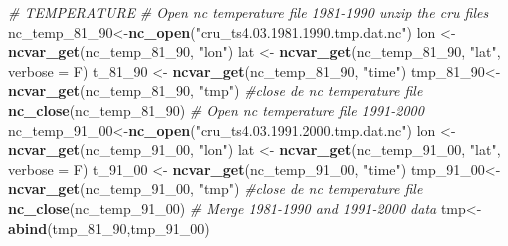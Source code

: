 \documentclass[
  10pt,
  b5paper,
]{book}
\newenvironment{Shaded}{\begin{snugshade}}{\end{snugshade}}
\newcommand{\CommentTok}[1]{\textcolor[rgb]{0.56,0.35,0.01}{\textit{#1}}}
\newcommand{\DataTypeTok}[1]{\textcolor[rgb]{0.13,0.29,0.53}{#1}}
\newcommand{\DecValTok}[1]{\textcolor[rgb]{0.00,0.00,0.81}{#1}}
\newcommand{\KeywordTok}[1]{\textcolor[rgb]{0.13,0.29,0.53}{\textbf{#1}}}
\newcommand{\NormalTok}[1]{#1}
\newcommand{\StringTok}[1]{\textcolor[rgb]{0.31,0.60,0.02}{#1}}
\begin{document}
\begin{Shaded}
\begin{Highlighting}[]
\CommentTok{# TEMPERATURE}
\CommentTok{# Open nc temperature file 1981-1990 unzip the cru files}
\NormalTok{nc_temp_}\DecValTok{81}\NormalTok{_}\DecValTok{90}\NormalTok{<-}\KeywordTok{nc_open}\NormalTok{(}\StringTok{"cru_ts4.03.1981.1990.tmp.dat.nc"}\NormalTok{)}
\NormalTok{lon <-}\StringTok{ }\KeywordTok{ncvar_get}\NormalTok{(nc_temp_}\DecValTok{81}\NormalTok{_}\DecValTok{90}\NormalTok{, }\StringTok{"lon"}\NormalTok{)}
\NormalTok{lat <-}\StringTok{ }\KeywordTok{ncvar_get}\NormalTok{(nc_temp_}\DecValTok{81}\NormalTok{_}\DecValTok{90}\NormalTok{, }\StringTok{"lat"}\NormalTok{, }\DataTypeTok{verbose =}\NormalTok{ F)}
\NormalTok{t_}\DecValTok{81}\NormalTok{_}\DecValTok{90}\NormalTok{ <-}\StringTok{ }\KeywordTok{ncvar_get}\NormalTok{(nc_temp_}\DecValTok{81}\NormalTok{_}\DecValTok{90}\NormalTok{, }\StringTok{"time"}\NormalTok{)}
\NormalTok{tmp_}\DecValTok{81}\NormalTok{_}\DecValTok{90}\NormalTok{<-}\KeywordTok{ncvar_get}\NormalTok{(nc_temp_}\DecValTok{81}\NormalTok{_}\DecValTok{90}\NormalTok{, }\StringTok{"tmp"}\NormalTok{)}
\CommentTok{#close de nc temperature file}
\KeywordTok{nc_close}\NormalTok{(nc_temp_}\DecValTok{81}\NormalTok{_}\DecValTok{90}\NormalTok{) }
\CommentTok{# Open nc temperature file 1991-2000}
\NormalTok{nc_temp_}\DecValTok{91}\NormalTok{_}\DecValTok{00}\NormalTok{<-}\KeywordTok{nc_open}\NormalTok{(}\StringTok{"cru_ts4.03.1991.2000.tmp.dat.nc"}\NormalTok{)}
\NormalTok{lon <-}\StringTok{ }\KeywordTok{ncvar_get}\NormalTok{(nc_temp_}\DecValTok{91}\NormalTok{_}\DecValTok{00}\NormalTok{, }\StringTok{"lon"}\NormalTok{)}
\NormalTok{lat <-}\StringTok{ }\KeywordTok{ncvar_get}\NormalTok{(nc_temp_}\DecValTok{91}\NormalTok{_}\DecValTok{00}\NormalTok{, }\StringTok{"lat"}\NormalTok{, }\DataTypeTok{verbose =}\NormalTok{ F)}
\NormalTok{t_}\DecValTok{91}\NormalTok{_}\DecValTok{00}\NormalTok{ <-}\StringTok{ }\KeywordTok{ncvar_get}\NormalTok{(nc_temp_}\DecValTok{91}\NormalTok{_}\DecValTok{00}\NormalTok{, }\StringTok{"time"}\NormalTok{)}
\NormalTok{tmp_}\DecValTok{91}\NormalTok{_}\DecValTok{00}\NormalTok{<-}\KeywordTok{ncvar_get}\NormalTok{(nc_temp_}\DecValTok{91}\NormalTok{_}\DecValTok{00}\NormalTok{, }\StringTok{"tmp"}\NormalTok{)}
\CommentTok{#close de nc temperature file}
\KeywordTok{nc_close}\NormalTok{(nc_temp_}\DecValTok{91}\NormalTok{_}\DecValTok{00}\NormalTok{) }
\CommentTok{# Merge 1981-1990 and 1991-2000 data }
\NormalTok{tmp<-}\KeywordTok{abind}\NormalTok{(tmp_}\DecValTok{81}\NormalTok{_}\DecValTok{90}\NormalTok{,tmp_}\DecValTok{91}\NormalTok{_}\DecValTok{00}\NormalTok{)}
\end{Highlighting}
\end{Shaded}
\end{document}
